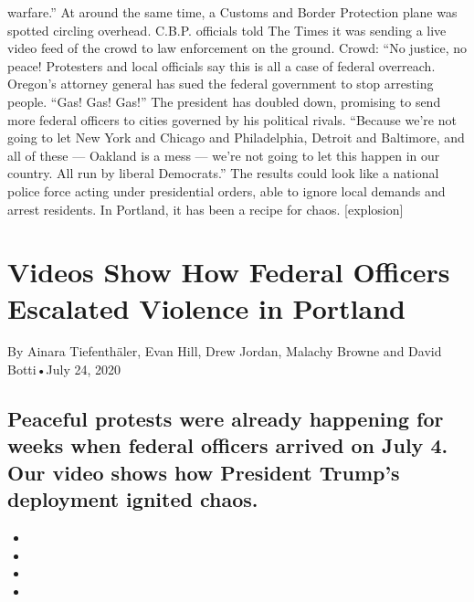 \begin{itemize}
  warfare.'' At around the same time, a Customs and Border Protection
  plane was spotted circling overhead. C.B.P. officials told The Times
  it was sending a live video feed of the crowd to law enforcement on
  the ground. Crowd: ``No justice, no peace! Protesters and local
  officials say this is all a case of federal overreach. Oregon's
  attorney general has sued the federal government to stop arresting
  people. ``Gas! Gas! Gas!'' The president has doubled down, promising
  to send more federal officers to cities governed by his political
  rivals. ``Because we're not going to let New York and Chicago and
  Philadelphia, Detroit and Baltimore, and all of these --- Oakland is a
  mess --- we're not going to let this happen in our country. All run by
  liberal Democrats.'' The results could look like a national police
  force acting under presidential orders, able to ignore local demands
  and arrest residents. In Portland, it has been a recipe for chaos.
  {[}explosion{]}
\end{itemize}

\hypertarget{videos-show-how-federal-officers-escalated-violence-in-portland-1}{%
\section{Videos Show How Federal Officers Escalated Violence in
Portland}\label{videos-show-how-federal-officers-escalated-violence-in-portland-1}}

By Ainara Tiefenthäler, Evan Hill, Drew Jordan, Malachy Browne and David
Botti•July 24, 2020

\hypertarget{peaceful-protests-were-already-happening-for-weeks-when-federal-officers-arrived-on-july-4-our-video-shows-how-president-trumps-deployment-ignited-chaos-1}{%
\subsection{Peaceful protests were already happening for weeks when
federal officers arrived on July 4. Our video shows how President
Trump's deployment ignited
chaos.}\label{peaceful-protests-were-already-happening-for-weeks-when-federal-officers-arrived-on-july-4-our-video-shows-how-president-trumps-deployment-ignited-chaos-1}}

\begin{itemize}
\item
\item
\item
\item
\end{itemize}


